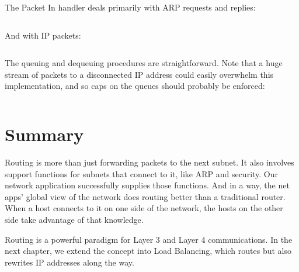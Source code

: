 \inputminted[firstline=94,lastline=110]{python}{code/routing/router_handler.py} 

The Packet In handler deals primarily with ARP requests and replies:

\inputminted[firstline=111,lastline=147]{python}{code/routing/router_handler.py} 

And with IP packets:

\inputminted[firstline=149]{python}{code/routing/router_handler.py} 

The queuing and dequeuing procedures are straightforward.  Note that a huge stream of packets to a 
disconnected IP address could easily overwhelm this implementation, and so caps on the queues should
probably be enforced:

\inputminted[firstline=54,lastline=92]{python}{code/routing/router_handler.py} 

\section{Summary}

Routing is more than just forwarding packets to the next subnet.  It also involves support functions
for subnets that connect to it, like ARP and security.  Our network application successfully supplies
those functions.  And in a way, the net apps' global view of the network does routing better than
a traditional router.   When a host connects to it on one side of the network, the hosts 
on the other side take advantage of that knowledge.

Routing is a powerful paradigm for Layer 3 and Layer 4 communications.  In the next chapter, we
extend the concept into Load Balancing, which routes but also rewrites IP addresses along the 
way.  